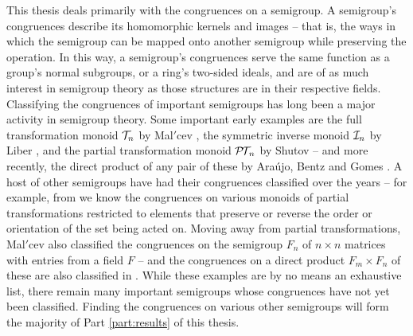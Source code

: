 This thesis deals primarily with the congruences on a semigroup.  A semigroup's
congruences describe its homomorphic kernels and images -- that is, the ways in
which the semigroup can be mapped onto another semigroup while preserving the
operation.  In this way, a semigroup's congruences serve the same function as a
group's normal subgroups, or a ring's two-sided ideals, and are of as much
interest in semigroup theory as those structures are in their respective fields.
Classifying the congruences of important semigroups has long been a major
activity in semigroup theory.  Some important early examples are the full
transformation monoid $\mathcal{T}_n$ by Mal$'$cev \cite{malcev_1952}, the symmetric
inverse monoid $\mathcal{I}_n$ by Liber \cite{liber_1953}, and the partial transformation
monoid $\mathcal{P\!T\!}_n$ by Shutov \cite{shutov_1988} -- and more recently, the direct
product of any pair of these by Ara{\'u}jo, Bentz and Gomes \cite{bentz_congs}.
A host of other semigroups have had their congruences classified over the years
-- for example, from \cite{fernandes_2000, lisbon_ii, lisbon_i} we know the
congruences on various monoids of partial transformations restricted to elements
that preserve or reverse the order or orientation of the set being acted on.
Moving away from partial transformations, Mal$'$cev also classified the
congruences on the semigroup $F_n$ of $n \times n$ matrices with entries from a
field $F$ \cite{malcev_matrices} -- and the congruences on a direct product
$F_m \times F_n$ of these are also classified in \cite{bentz_congs}.  While
these examples are by no means an exhaustive list, there remain many important
semigroups whose congruences have not yet been classified.  Finding the
congruences on various other semigroups will form the majority of Part
\ref{part:results} of this thesis.


